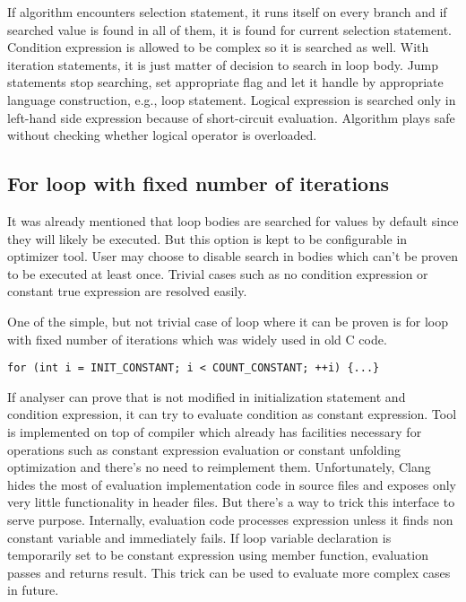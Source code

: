 If algorithm encounters selection statement, it runs itself on every branch and if searched value is found in all of them, it is found for current selection statement. Condition expression is allowed to be complex so it is searched as well. With iteration statements, it is just matter of decision to search in loop body. Jump statements stop searching, set appropriate flag and let it handle by appropriate language construction, e.g., loop statement. Logical expression is searched only in left-hand side expression because of short-circuit evaluation. Algorithm plays safe without checking whether logical operator is overloaded.

\subsection{For loop with fixed number of iterations}
\label{prefetch-for}
It was already mentioned that loop bodies are searched for values by default since they will likely be executed. But this option is kept to be configurable in optimizer tool. User may choose to disable search in bodies which can't be proven to be executed at least once. Trivial cases such as no condition expression or constant true expression are resolved easily.

One of the simple, but not trivial case of loop where it can be proven is for loop with fixed number of iterations which was widely used in old C code.

\begin{lstlisting}
for (int i = INIT_CONSTANT; i < COUNT_CONSTANT; ++i) {...}
\end{lstlisting}

If analyser can prove that  is not modified in initialization statement and condition expression, it can try to evaluate condition as constant expression. Tool is implemented on top of compiler which already has facilities necessary for operations such as constant expression evaluation or constant unfolding optimization and there's no need to reimplement them. Unfortunately, Clang hides the most of evaluation implementation code in source files and exposes only very little functionality in header files. But there's a way to trick this interface to serve purpose. Internally, evaluation code processes expression unless it finds non constant variable and immediately fails. If loop variable declaration is temporarily set to be constant expression using  member function, evaluation passes and returns result. This trick can be used to evaluate more complex cases in future.

